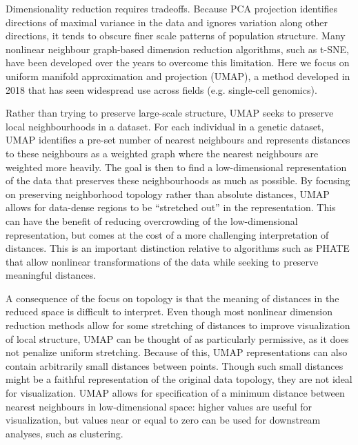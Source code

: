 \documentclass[12pt]{article}
\begin{document}
Dimensionality reduction requires tradeoffs. Because PCA projection identifies directions of maximal variance in the data and ignores variation along other directions, it tends to obscure finer scale patterns of population structure. Many nonlinear neighbour graph-based dimension reduction algorithms, such as t-SNE\cite{maaten2008visualizing}, have been developed over the years to overcome this limitation. Here we focus on uniform manifold approximation and projection (UMAP)\cite{mcinnes_umap_2018}, a method developed in 2018 that has seen widespread use across fields (e.g. single-cell genomics\cite{becht_dimensionality_2019}). 

Rather than trying to preserve large-scale structure, UMAP seeks to preserve local neighbourhoods in a dataset. For each individual in a genetic dataset, UMAP identifies a pre-set number of nearest neighbours and represents distances to these neighbours as a weighted graph where the nearest neighbours are weighted more heavily. The goal is then to find a low-dimensional representation of the data that preserves these neighbourhoods as much as possible. By focusing on preserving neighborhood topology rather than absolute distances, UMAP allows for data-dense regions to be ``stretched out'' in the representation. This can have the benefit of reducing overcrowding of the low-dimensional representation, but comes at the cost of a more challenging interpretation of distances.  This is an important distinction relative to algorithms such as PHATE \cite{moon2019visualizing} that allow nonlinear transformations of the data while seeking to preserve meaningful distances. 

A consequence of the focus on topology is that the meaning of distances in the reduced space is difficult to interpret. Even though most nonlinear dimension reduction methods allow for some stretching of distances to improve visualization of local structure, UMAP can be thought of as particularly permissive, as it does not penalize uniform stretching. Because of this, UMAP representations can also contain arbitrarily small distances between points. Though such small distances might be a faithful representation of the original data topology, they are not ideal for visualization. UMAP allows for specification of a minimum distance between nearest neighbours in low-dimensional space: higher values are useful for visualization, but values near or equal to zero can be used for downstream analyses, such as clustering.
\end{document}
